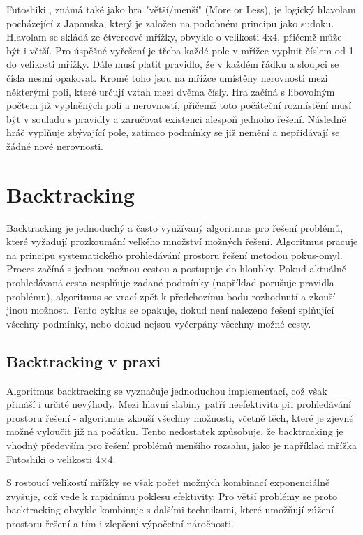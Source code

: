 Futoshiki \cite{FutoshikiWiki}, známá také jako hra "větší/menší" (More or
Less), je logický hlavolam pocházející z Japonska, který je založen na podobném
principu jako sudoku. Hlavolam se skládá ze čtvercové mřížky, obvykle o
velikosti 4x4, přičemž může být i větší. Pro úspěšné vyřešení je třeba každé
pole v mřížce vyplnit číslem od 1 do velikosti mřížky. Dále musí platit
pravidlo, že v každém řádku a sloupci se čísla nesmí opakovat. Kromě toho jsou
na mřížce umístěny nerovnosti mezi některými poli, které určují vztah mezi
dvěma čísly. Hra začíná s libovolným počtem již vyplněných polí a nerovností,
přičemž toto počáteční rozmístění musí být v souladu s pravidly a zaručovat
existenci alespoň jednoho řešení. Následně hráč vyplňuje zbývající pole,
zatímco podmínky se již nemění a nepřidávají se žádné nové nerovnosti.

\section{Backtracking}

Backtracking \cite{PrednaskyIZU} je jednoduchý a často využívaný algoritmus pro
řešení problémů, které vyžadují prozkoumání velkého množství možných řešení.
Algoritmus pracuje na principu systematického prohledávání prostoru řešení
metodou pokus-omyl. Proces začíná s jednou možnou cestou a postupuje do
hloubky. Pokud aktuálně prohledávaná cesta nesplňuje zadané podmínky (například
porušuje pravidla problému), algoritmus se vrací zpět k předchozímu bodu
rozhodnutí a zkouší jinou možnost. Tento cyklus se opakuje, dokud není nalezeno
řešení splňující všechny podmínky, nebo dokud nejsou vyčerpány všechny možné
cesty.

\subsection{Backtracking v praxi}

Algoritmus backtracking se vyznačuje jednoduchou implementací, což však přináší
i určité nevýhody. Mezi hlavní slabiny patří neefektivita při prohledávání
prostoru řešení - algoritmus zkouší všechny možnosti, včetně těch, které je
zjevně možné vyloučit již na počátku. Tento nedostatek způsobuje, že
backtracking je vhodný především pro řešení problémů menšího rozsahu, jako je
například mřížka Futoshiki o velikosti 4×4.

S rostoucí velikostí mřížky se však počet možných kombinací exponenciálně
zvyšuje, což vede k rapidnímu poklesu efektivity. Pro větší problémy se proto
backtracking obvykle kombinuje s dalšími technikami, které umožňují zúžení
prostoru řešení a tím i zlepšení výpočetní náročnosti.

